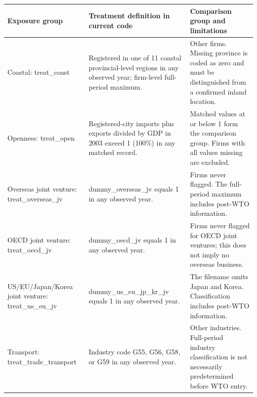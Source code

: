 \documentclass[10pt]{article}
\begin{document}
\begin{minipage}{19cm}\fontsize{10}{12}\selectfont\setlength{\tabcolsep}{4pt}\renewcommand{\arraystretch}{1.12}

\centering
\begin{tabular}{>{\raggedright\arraybackslash}p{5.70cm}>{\raggedright\arraybackslash}p{5.70cm}>{\raggedright\arraybackslash}p{5.70cm}}
\toprule
Exposure group & Treatment definition in current code & Comparison group and limitations \\
\midrule
Coastal: treat\_\allowbreak coast & Registered in one of 11 coastal provincial-level regions in any observed year; firm-level full-period maximum. & Other firms. Missing province is coded as zero and must be distinguished from a confirmed inland location. \\
Openness: treat\_\allowbreak open & Registered-city imports plus exports divided by GDP in 2003 exceed 1 (100\%) in any matched record. & Matched values at or below 1 form the comparison group. Firms with all values missing are excluded. \\
Overseas joint venture: treat\_\allowbreak overseas\_\allowbreak jv & dummy\_\allowbreak overseas\_\allowbreak jv equals 1 in any observed year. & Firms never flagged. The full-period maximum includes post-WTO information. \\
OECD joint venture: treat\_\allowbreak oecd\_\allowbreak jv & dummy\_\allowbreak oecd\_\allowbreak jv equals 1 in any observed year. & Firms never flagged for OECD joint ventures; this does not imply no overseas business. \\
US/\allowbreak EU/\allowbreak Japan/\allowbreak Korea joint venture: treat\_\allowbreak us\_\allowbreak eu\_\allowbreak jv & dummy\_\allowbreak us\_\allowbreak eu\_\allowbreak jp\_\allowbreak kr\_\allowbreak jv equals 1 in any observed year. & The filename omits Japan and Korea. Classification includes post-WTO information. \\
Transport: treat\_\allowbreak trade\_\allowbreak transport & Industry code G55, G56, G58, or G59 in any observed year. & Other industries. Full-period industry classification is not necessarily predetermined before WTO entry. \\
\bottomrule\end{tabular}

\end{minipage}
\end{document}
